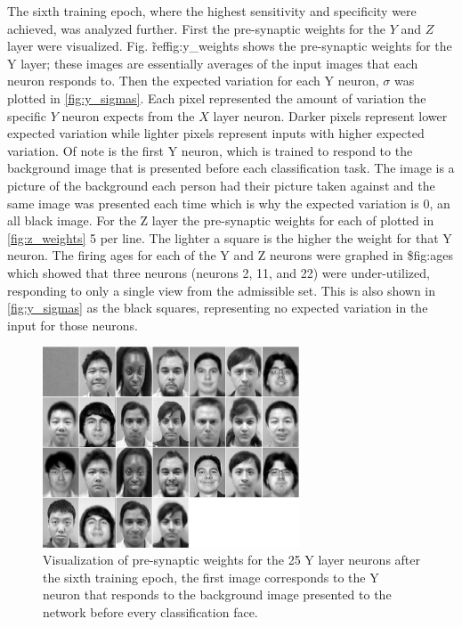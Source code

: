 \documentclass[conference]{IEEEtran}
\begin{document}
The sixth training epoch, where the highest sensitivity and specificity were achieved, was analyzed further.  First the pre-synaptic weights for the $Y$ and $Z$ layer were visualized.  Fig. \~ref{fig:y\_weights} shows the pre-synaptic weights for the Y layer; these images are essentially averages of the input images that each neuron responds to.  Then the expected variation for each Y neuron, $\sigma$ was plotted in \ref{fig:y_sigmas}.  Each pixel represented the amount of variation the specific $Y$ neuron expects from the $X$ layer neuron.  Darker pixels represent lower expected variation while lighter pixels represent inputs with higher expected variation.  Of note is the first Y neuron, which is trained to respond to the background image that is presented before each classification task.  The image is a picture of the background each person had their picture taken against and the same image was presented each time which is why the expected variation is 0, an all black image.  For the Z layer the pre-synaptic weights for each of plotted in \ref{fig:z_weights} 5 per line. The lighter a square is the higher the weight for that Y neuron.  The firing ages for each of the Y and Z neurons were graphed in \${fig:ages} which showed that three neurons (neurons 2, 11, and 22) were under-utilized, responding to only a single view from the admissible set.  This is also shown in \ref{fig:y_sigmas} as the black squares, representing no expected variation in the input for those neurons.

\begin{figure}
\center
\includegraphics[width=3in]{figs/epoch_5_0_xy}
\caption{Visualization of pre-synaptic weights for the 25 Y layer neurons after the sixth training epoch, the first image corresponds to the Y neuron that responds to the background image presented to the network before every classification face.}
\label{fig:y_weights}
\end{figure}
\end{document}
